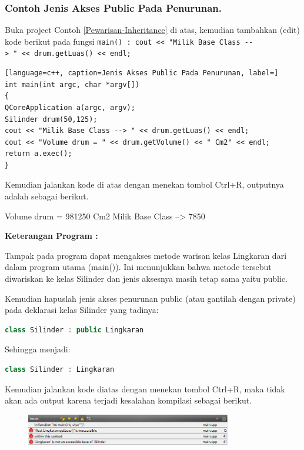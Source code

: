 \subsubsection*{Contoh  Jenis Akses Public Pada Penurunan.}

Buka project Contoh \ref{Pewarisan-Inheritance} di atas, kemudian tambahkan (edit) kode berikut
pada fungsi
\texttt{main()\ :\ cout\ \textless{}\textless{}\ "Milik\ Base\ Class\ -\/-\textgreater{}\ "\ \textless{}\textless{}\ drum.getLuas()\ \textless{}\textless{}\ endl;}

\begin{lstlisting}[language=c++, caption=Jenis Akses Public Pada Penurunan, label=]
int main(int argc, char *argv[])
{
QCoreApplication a(argc, argv);
Silinder drum(50,125);
cout << "Milik Base Class --> " << drum.getLuas() << endl;
cout << "Volume drum = " << drum.getVolume() << " Cm2" << endl;
return a.exec();
}
\end{lstlisting}

Kemudian jalankan kode di atas dengan menekan tombol Ctrl+R, outputnya
adalah sebagai berikut.
\begin{lcverbatim}
Volume drum = 981250 Cm2
Milik Base Class --> 7850
\end{lcverbatim}


\textbf{Keterangan Program :}

Tampak pada program dapat mengakses metode warisan kelas Lingkaran dari
dalam program utama (main()). Ini menunjukkan bahwa metode tersebut
diwariskan ke kelas Silinder dan jenis aksesnya masih tetap sama yaitu
public.

Kemudian hapuslah jenis akses penurunan public (atau gantilah dengan
private) pada deklarasi kelas Silinder yang tadinya:

\begin{lstlisting}[language=c++, numbers=none]
class Silinder : public Lingkaran
\end{lstlisting}

Sehingga menjadi:

\begin{lstlisting}[language=c++, numbers=none]
class Silinder : Lingkaran
\end{lstlisting}

Kemudian jalankan kode diatas dengan menekan tombol Ctrl+R, maka tidak
akan ada output karena terjadi kesalahan kompilasi sebagai berikut.

\begin{figure}[htbp]
\centering
\includegraphics[width=0.8\textwidth]{images/capture7-1.png}

\end{figure}

